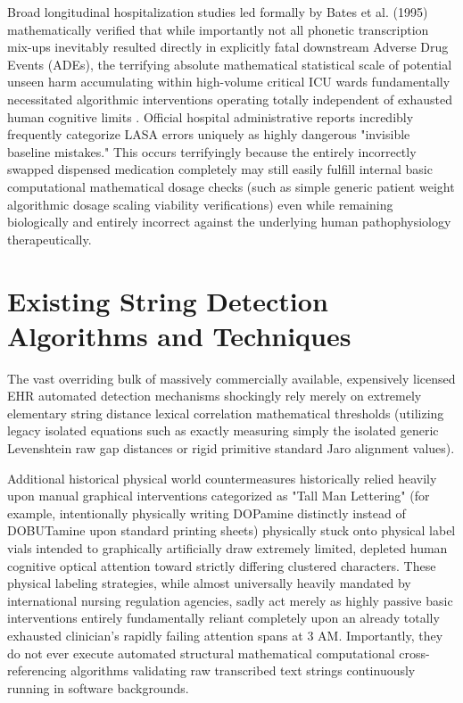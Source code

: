 \documentclass[12pt,a4paper]{report}
\begin{document}
Broad longitudinal hospitalization studies led formally by Bates et al. (1995) mathematically verified that while importantly not all phonetic transcription mix-ups inevitably resulted directly in explicitly fatal downstream Adverse Drug Events (ADEs), the terrifying absolute mathematical statistical scale of potential unseen harm accumulating within high-volume critical ICU wards fundamentally necessitated algorithmic interventions operating totally independent of exhausted human cognitive limits \cite{bates1995}. Official hospital administrative reports incredibly frequently categorize LASA errors uniquely as highly dangerous "invisible baseline mistakes." This occurs terrifyingly because the entirely incorrectly swapped dispensed medication completely may still easily fulfill internal basic computational mathematical dosage checks (such as simple generic patient weight algorithmic dosage scaling viability verifications) even while remaining biologically and entirely incorrect against the underlying human pathophysiology therapeutically.

\section{Existing String Detection Algorithms and Techniques}
The vast overriding bulk of massively commercially available, expensively licensed EHR automated detection mechanisms shockingly rely merely on extremely elementary string distance lexical correlation mathematical thresholds (utilizing legacy isolated equations such as exactly measuring simply the isolated generic Levenshtein raw gap distances or rigid primitive standard Jaro alignment values).

Additional historical physical world countermeasures historically relied heavily upon manual graphical interventions categorized as "Tall Man Lettering" (for example, intentionally physically writing DOPamine distinctly instead of DOBUTamine upon standard printing sheets) physically stuck onto physical label vials intended to graphically artificially draw extremely limited, depleted human cognitive optical attention toward strictly differing clustered characters. These physical labeling strategies, while almost universally heavily mandated by international nursing regulation agencies, sadly act merely as highly passive basic interventions entirely fundamentally reliant completely upon an already totally exhausted clinician's rapidly failing attention spans at 3 AM. Importantly, they do not ever execute automated structural mathematical computational cross-referencing algorithms validating raw transcribed text strings continuously running in software backgrounds.
\end{document}

